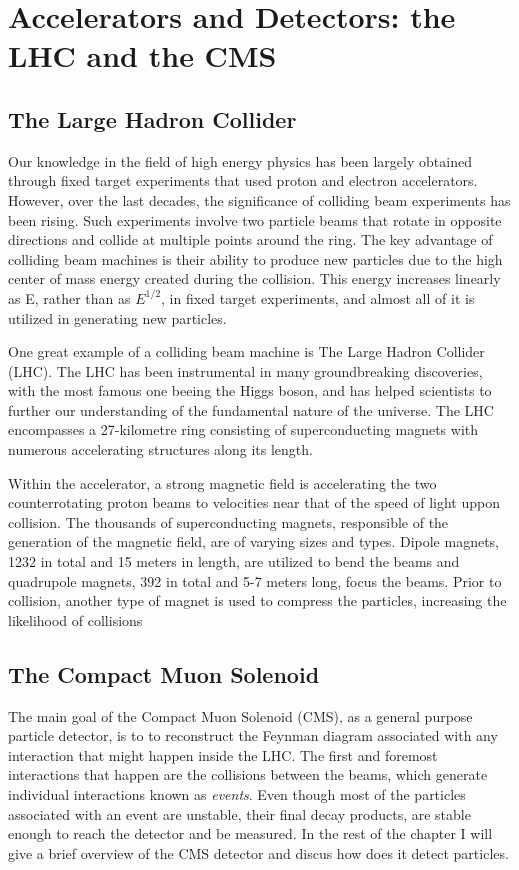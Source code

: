 
\section{Accelerators and Detectors: the LHC and the CMS}
\label{sec:org3878a16}
\subsection{The Large Hadron Collider}
\label{sec:org5906b28}
Our knowledge in the field of high energy physics has been largely obtained through fixed target experiments that used proton and electron accelerators. However, over the last decades, the significance of colliding beam experiments has been rising. Such experiments involve two particle beams that rotate in opposite directions and collide at multiple points around the ring. The key advantage of colliding beam machines is their ability to produce new particles due to the high center of mass energy created during the collision. This energy increases linearly as E, rather than as \(E^{1/2}\), in fixed target experiments, and almost all of it is utilized in generating new particles\cite{thomson_2013}.

One great example of a colliding beam machine is The Large Hadron Collider (LHC).  The LHC has been instrumental in many groundbreaking discoveries, with the most famous one beeing the Higgs boson, and has helped scientists to further our understanding of the fundamental nature of the universe. The LHC encompasses a 27-kilometre ring consisting of superconducting magnets with numerous accelerating structures along its length.

Within the accelerator, a strong magnetic field is accelerating the two counterrotating proton beams to velocities near that of the speed of light uppon collision.  The thousands of  superconducting magnets, responsible of the generation of the magnetic field, are of varying sizes and types. Dipole magnets, 1232 in total and 15 meters in length, are utilized to bend the beams and quadrupole magnets, 392 in total and 5-7 meters long, focus the beams. Prior to collision, another type of magnet is used to compress the particles, increasing the likelihood of collisions \cite{MomentumCMS}
\subsection{The Compact Muon Solenoid}
\label{sec:orgccfbfe1}
The main goal of  the Compact Muon Solenoid (CMS), as a general purpose particle detector, is to  to reconstruct the Feynman diagram associated with any interaction that might happen inside the LHC. The first and foremost interactions that happen are the collisions between the beams, which generate individual interactions known as \emph{events}. Even though most of the particles associated with an event are unstable, their final decay products, are stable enough to reach the detector and be measured. In the rest of the chapter I will give a brief overview of the CMS detector and discus how does it detect particles.

